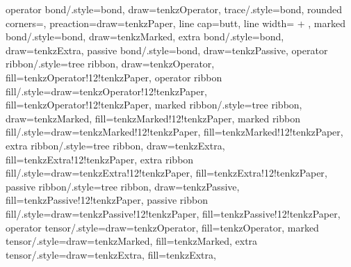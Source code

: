 {  operator bond/.style={bond, draw=tenkzOperator},
  trace/.style={bond, rounded corners=\tenkz@dim{\tenkz@r@corner},
      preaction={draw=tenkzPaper, line cap=butt,
        line width=\dimexpr\tenkz@wirewidth
          + \tenkz@dim{\tenkz@r@crossgap}\relax}},
  marked bond/.style={bond, draw=tenkzMarked},
  extra bond/.style={bond, draw=tenkzExtra},
  passive bond/.style={bond, draw=tenkzPassive},
  operator ribbon/.style={tree ribbon, draw=tenkzOperator,
      fill=tenkzOperator!12!tenkzPaper},
  operator ribbon fill/.style={draw=tenkzOperator!12!tenkzPaper,
      fill=tenkzOperator!12!tenkzPaper},
  marked ribbon/.style={tree ribbon, draw=tenkzMarked,
      fill=tenkzMarked!12!tenkzPaper},
  marked ribbon fill/.style={draw=tenkzMarked!12!tenkzPaper,
      fill=tenkzMarked!12!tenkzPaper},
  extra ribbon/.style={tree ribbon, draw=tenkzExtra,
      fill=tenkzExtra!12!tenkzPaper},
  extra ribbon fill/.style={draw=tenkzExtra!12!tenkzPaper,
      fill=tenkzExtra!12!tenkzPaper},
  passive ribbon/.style={tree ribbon, draw=tenkzPassive,
      fill=tenkzPassive!12!tenkzPaper},
  passive ribbon fill/.style={draw=tenkzPassive!12!tenkzPaper,
      fill=tenkzPassive!12!tenkzPaper},
  operator tensor/.style={draw=tenkzOperator, fill=tenkzOperator},
  marked tensor/.style={draw=tenkzMarked, fill=tenkzMarked},
  extra tensor/.style={draw=tenkzExtra, fill=tenkzExtra},
}
